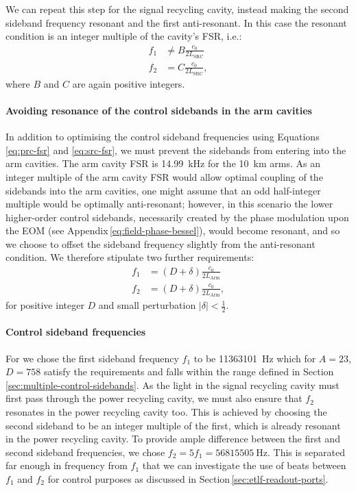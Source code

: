 We can repeat this step for the signal recycling cavity, instead making the second sideband frequency resonant and the first anti-resonant. In this case the resonant condition is an integer multiple of the cavity's \gls{FSR}, i.e.:
\begin{align}
  \label{eq:src-fsr}
  f_1 &\neq B \frac{c_0}{2 L_{\text{SRC}}} \\
  f_2 &= C \frac{c_0}{2 L_{\text{SRC}}},
\end{align}
where $B$ and $C$ are again positive integers.

\paragraph{Avoiding resonance of the control sidebands in the arm cavities}
In addition to optimising the control sideband frequencies using Equations \ref{eq:prc-fsr} and \ref{eq:src-fsr}, we must prevent the sidebands from entering into the arm cavities. The arm cavity \gls{FSR} is \SI{14.99}{\kilo\hertz} for the \SI{10}{\kilo\meter} arms. As an integer multiple of the arm cavity \gls{FSR} would allow optimal coupling of the sidebands into the arm cavities, one might assume that an odd half-integer multiple would be optimally anti-resonant; however, in this scenario the lower higher-order control sidebands, necessarily created by the phase modulation upon the \gls{EOM} (see Appendix\,\ref{eq:field-phase-bessel}), would become resonant, and so we choose to offset the sideband frequency slightly from the anti-resonant condition. We therefore stipulate two further requirements:
\begin{align}
  \label{eq:arm-fsr}
  f_1 &= \left(D + \delta \right) \frac{c_0}{2 L_{\text{Arm}}} \\
  f_2 &= \left(D + \delta \right) \frac{c_0}{2 L_{\text{Arm}}},
\end{align}
for positive integer $D$ and small perturbation $\left| \delta \right| < \frac{1}{2}$.

\paragraph{Control sideband frequencies}
For \ETLF{} we chose the first sideband frequency $f_1$ to be \SI{11363101}{\hertz} which for $A = 23$, $D = 758$ satisfy the requirements and falls within the range defined in Section\,\ref{sec:multiple-control-sidebands}. As the light in the signal recycling cavity must first pass through the power recycling cavity, we must also ensure that $f_2$ resonates in the power recycling cavity too. This is achieved by choosing the second sideband to be an integer multiple of the first, which is already resonant in the power recycling cavity. To provide ample difference between the first and second sideband frequencies, we chose $f_2 = 5f_1 = \SI{56815505}{\hertz}$. This is separated far enough in frequency from $f_1$ that we can investigate the use of beats between $f_1$ and $f_2$ for control purposes as discussed in Section\,\ref{sec:etlf-readout-ports}.

